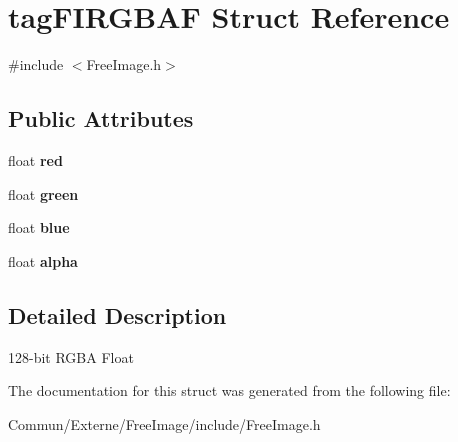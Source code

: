 \hypertarget{structtag_f_i_r_g_b_a_f}{}\section{tag\+F\+I\+R\+G\+B\+AF Struct Reference}
\label{structtag_f_i_r_g_b_a_f}


{\ttfamily \#include $<$Free\+Image.\+h$>$}

\subsection*{Public Attributes}
\begin{DoxyCompactItemize}
\item 
float {\bfseries red}\hypertarget{structtag_f_i_r_g_b_a_f_a59e5260e2f6e013661bc5d4775b18d9e}{}\label{structtag_f_i_r_g_b_a_f_a59e5260e2f6e013661bc5d4775b18d9e}

\item 
float {\bfseries green}\hypertarget{structtag_f_i_r_g_b_a_f_ac4e284e0711fdba31b624cee92d85e2b}{}\label{structtag_f_i_r_g_b_a_f_ac4e284e0711fdba31b624cee92d85e2b}

\item 
float {\bfseries blue}\hypertarget{structtag_f_i_r_g_b_a_f_a9c2e5ec45c4c33518fd4765f5fd04b01}{}\label{structtag_f_i_r_g_b_a_f_a9c2e5ec45c4c33518fd4765f5fd04b01}

\item 
float {\bfseries alpha}\hypertarget{structtag_f_i_r_g_b_a_f_a59da6fdc089e6ad1f8b2be601815f5cb}{}\label{structtag_f_i_r_g_b_a_f_a59da6fdc089e6ad1f8b2be601815f5cb}

\end{DoxyCompactItemize}


\subsection{Detailed Description}
128-\/bit R\+G\+BA Float 

The documentation for this struct was generated from the following file\+:\begin{DoxyCompactItemize}
\item 
Commun/\+Externe/\+Free\+Image/include/Free\+Image.\+h\end{DoxyCompactItemize}

